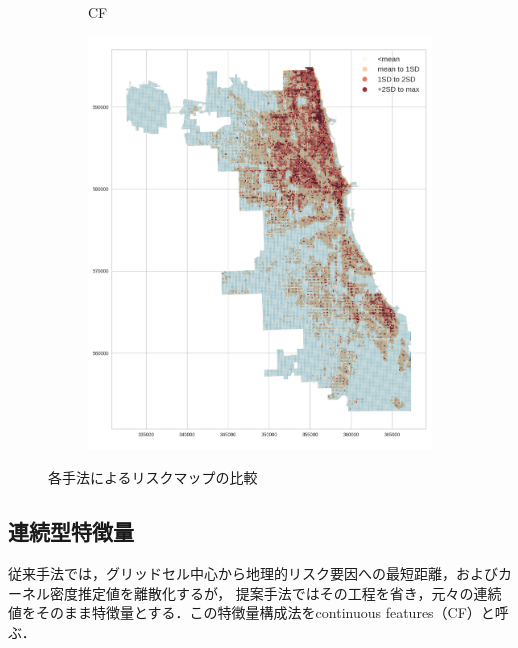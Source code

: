 \begin{figure}[t]
\begin{subfigure}{0.3\textwidth}
    \caption{CF}
    \label{fig:non-crime-timeseries-cf-risk}
  \end{subfigure}
  \begin{subfigure}{0.3\textwidth}
    \includegraphics[scale=0.25]{./figures/CI_riskmap.png}
    \caption{\cfsq}
    \label{fig:non-crime-timeseries-ci-risk}
  \end{subfigure}
  \label{fig:non-crime-timeseries-risks}
  \caption{各手法によるリスクマップの比較}
\end{figure}


\subsection{連続型特徴量}
従来手法\cite{caplan2015risk}では，グリッドセル中心から地理的リスク要因への最短距離，およびカーネル密度推定値を離散化するが，
提案手法ではその工程を省き，元々の連続値をそのまま特徴量とする．この特徴量構成法をcontinuous features（CF）と呼ぶ．

